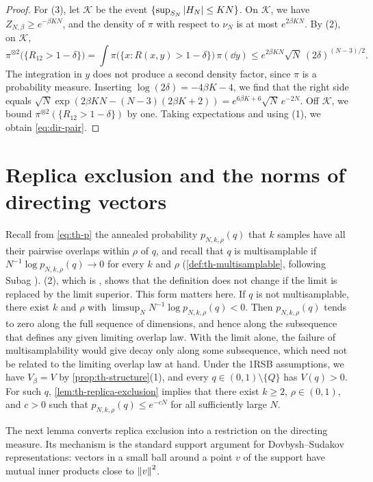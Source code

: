 \begin{proof}
For (3), let $\mathcal K$ be the event $\{\sup_{S_N}\left|H_N\right|\le KN\}$. On $\mathcal K$, we have $Z_{N,\beta}\ge e^{-\beta KN}$, and the density of $\pi$ with respect to $\nu_N$ is at most $e^{2\beta KN}$. By (2), on $\mathcal K$,
\[
\pi^{\otimes2}\big(\{R_{12}>1-\delta\}\big)=\int\pi\big(\{x:R(x,y)>1-\delta\}\big)\,\pi(\dd y)\le e^{2\beta KN}\sqrt N\,(2\delta)^{(N-3)/2}.
\]
The integration in $y$ does not produce a second density factor, since $\pi$ is a probability measure. Inserting $\log(2\delta)=-4\beta K-4$, we find that the right side equals $\sqrt N\exp(2\beta KN-(N-3)(2\beta K+2))=e^{6\beta K+6}\sqrt N\,e^{-2N}$. Off $\mathcal K$, we bound $\pi^{\otimes2}(\{R_{12}>1-\delta\})$ by one. Taking expectations and using (1), we obtain \eqref{eq:dir-pair}.
\end{proof}

\section{Replica exclusion and the norms of directing vectors}\label{sec:dir-exclusion}

Recall from \eqref{eq:th-p} the annealed probability $p_{N,k,\rho}(q)$ that $k$ samples have all their pairwise overlaps within $\rho$ of $q$, and recall that $q$ is multisamplable if $N^{-1}\log p_{N,k,\rho}(q)\to0$ for every $k$ and $\rho$ (\cref{def:th-multisamplable}, following Subag \cite[Definition~2]{Subag2024}). (2), which is \cite[footnote~4 and Remark~25]{Subag2024}, shows that the definition does not change if the limit is replaced by the limit superior. This form matters here. If $q$ is not multisamplable, there exist $k$ and $\rho$ with $\limsup_NN^{-1}\log p_{N,k,\rho}(q)<0$. Then $p_{N,k,\rho}(q)$ tends to zero along the full sequence of dimensions, and hence along the subsequence that defines any given limiting overlap law. With the limit alone, the failure of multisamplability would give decay only along some subsequence, which need not be related to the limiting overlap law at hand. Under the 1RSB assumptions, we have $V_\beta=V$ by \cref{prop:th-structure}(1), and every $q\in(0,1)\setminus\{Q\}$ has $V(q)>0$. For such $q$, \cref{lem:th-replica-exclusion} implies that there exist $k\ge2$, $\rho\in(0,1)$, and $c>0$ such that $p_{N,k,\rho}(q)\le e^{-cN}$ for all sufficiently large $N$.

The next lemma converts replica exclusion into a restriction on the directing measure. Its mechanism is the standard support argument for Dovbysh--Sudakov representations: vectors in a small ball around a point $v$ of the support have mutual inner products close to $\left\lVert v\right\rVert^2$.

